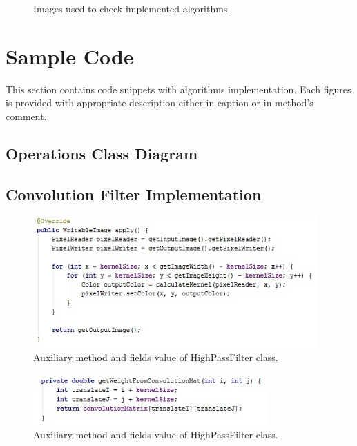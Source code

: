 \documentclass{article}
\begin{document}
\begin{figure}[H]
\begin{subfigure}{.5\textwidth}
    \caption{}
  \label{fig:sample_4}
\end{subfigure}
\caption{Images used to check implemented algorithms.}
\label{fig:double_samples}
\end{figure}

\pagebreak


\newpage
\section{Sample Code}
This section contains code snippets with algorithms implementation. Each figures is provided with appropriate description either in caption or in method's comment. 

%
%
\subsection{Operations Class Diagram}


%
%
\subsection{Convolution Filter Implementation}
\begin{figure}[H]
	\centering
	\includegraphics[width=0.97\textwidth]{_Figures/conv_filter_apply.jpg}
    \caption{Auxiliary method and fields value of HighPassFilter class.}
    \label{fig:code:treshold_func}
\end{figure}

\begin{figure}[H]
	\centering
	\includegraphics[width=0.8\textwidth]{_Figures/conv_filter_weight.jpg}
    \caption{Auxiliary method and fields value of HighPassFilter class.}
    \label{fig:code:treshold_func}
\end{figure}
\end{document}
